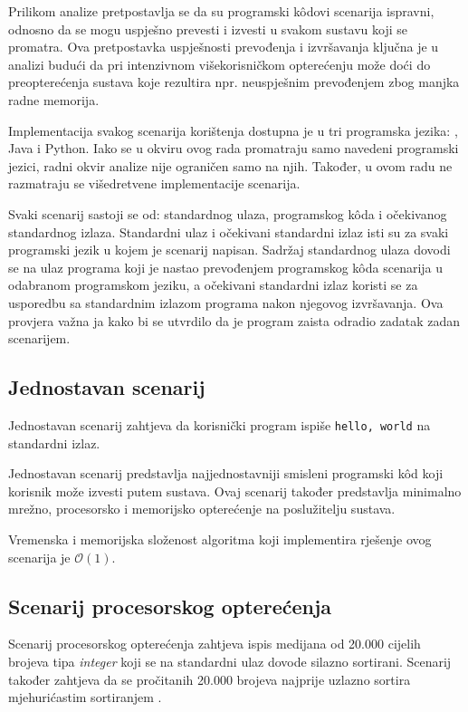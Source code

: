 \documentclass[times, utf8, diplomski]{fer}
\begin{document}
Prilikom analize pretpostavlja se da su programski kôdovi scenarija ispravni, odnosno da se mogu uspješno prevesti i izvesti u svakom sustavu koji se promatra. Ova pretpostavka uspješnosti prevođenja i izvršavanja ključna je u analizi budući da pri intenzivnom višekorisničkom opterećenju može doći do preopterećenja sustava koje rezultira npr. neuspješnim prevođenjem zbog manjka radne memorija.

Implementacija svakog scenarija korištenja dostupna je u tri programska jezika: , Java i Python. Iako se u okviru ovog rada promatraju samo navedeni programski jezici, radni okvir analize nije ograničen samo na njih. Također, u ovom radu ne razmatraju se višedretvene implementacije scenarija.

Svaki scenarij sastoji se od: standardnog ulaza, programskog kôda i očekivanog standardnog izlaza. Standardni ulaz i očekivani standardni izlaz isti su za svaki programski jezik u kojem je scenarij napisan. Sadržaj standardnog ulaza dovodi se na ulaz programa koji je nastao prevođenjem programskog kôda scenarija u odabranom programskom jeziku, a očekivani standardni izlaz koristi se za usporedbu sa standardnim izlazom programa nakon njegovog izvršavanja. Ova provjera važna ja kako bi se utvrdilo da je program zaista odradio zadatak zadan scenarijem.

\subsection{Jednostavan scenarij}
Jednostavan scenarij zahtjeva da korisnički program ispiše \lstinline{hello, world} na standardni izlaz.

Jednostavan scenarij predstavlja najjednostavniji smisleni programski kôd koji korisnik može izvesti putem sustava. Ovaj scenarij također predstavlja minimalno mrežno, procesorsko i memorijsko opterećenje na poslužitelju sustava.

Vremenska i memorijska složenost algoritma koji implementira rješenje ovog scenarija je $\mathcal{O}(1)$.

\subsection{Scenarij procesorskog opterećenja}
Scenarij procesorskog opterećenja zahtjeva ispis medijana od 20.000 cijelih brojeva tipa \textit{integer} koji se na standardni ulaz dovode silazno sortirani. Scenarij također zahtjeva da se pročitanih 20.000 brojeva najprije uzlazno sortira mjehurićastim sortiranjem .
\end{document}

